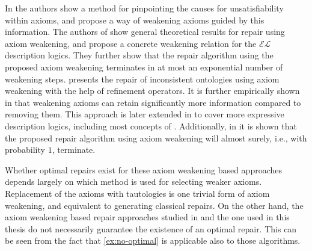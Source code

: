 In \cite{lam2008fine} the authors show a method for pinpointing the causes for unsatisfiability within axioms, and propose a way of weakening axioms guided by this information. The authors of \cite{baader2018making} show general theoretical results for repair using axiom weakening, and propose a concrete weakening relation for the $\mathcal{EL}$ description logics. They further show that the repair algorithm using the proposed axiom weakening terminates in at most an exponential number of weakening steps. \cite{troquard2018repairing} presents the repair of inconsistent ontologies using axiom weakening with the help of refinement operators. It is further empirically shown in \cite{troquard2018repairing} that weakening axioms can retain significantly more information compared to removing them. This approach is later extended in \cite{confalonieri2020towards,confalonieri2022irresistible} to cover more expressive description logics, including most concepts of \SROIQ. Additionally, in \cite{confalonieri2020towards} it is shown that the proposed repair algorithm using axiom weakening will almost surely, i.e., with probability $1$, terminate.

Whether optimal repairs exist for these axiom weakening based approaches depends largely on which method is used for selecting weaker axioms. Replacement of the axioms with tautologies is one trivial form of axiom weakening, and equivalent to generating classical repairs. On the other hand, the axiom weakening based repair approaches studied in \cite{troquard2018repairing,confalonieri2020towards} and the one used in this thesis do not necessarily guarantee the existence of an optimal repair. This can be seen from the fact that \cref{ex:no-optimal} is applicable also to those algorithms.

